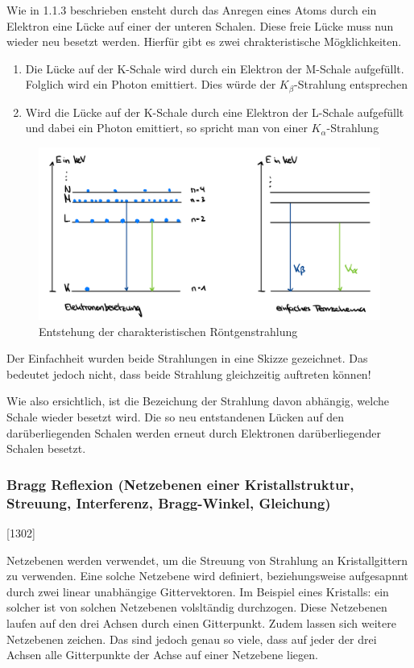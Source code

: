 \documentclass{article}
\begin{document}
Wie in 1.1.3 beschrieben ensteht durch das Anregen eines Atoms durch ein Elektron eine Lücke auf einer der unteren Schalen. Diese freie Lücke muss nun wieder neu besetzt werden. Hierfür gibt es zwei chrakteristische Mögklichkeiten.

\begin{enumerate}
    \item Die Lücke auf der K-Schale wird durch ein Elektron der M-Schale aufgefüllt. Folglich wird ein Photon emittiert. Dies würde der $K_{\beta}$-Strahlung entsprechen
    \item Wird die Lücke auf der K-Schale durch eine Elektron der L-Schale aufgefüllt und dabei ein Photon emittiert, so spricht man von einer $K_{\alpha}$-Strahlung
\end{enumerate}

\begin{figure}[H]
    \centering
    \includegraphics[width=0.6\linewidth]{Abbildungen/Entstehung_R.Strahlung.jpeg}
    \caption{Entstehung der charakteristischen Röntgenstrahlung}
\end{figure}

Der Einfachheit wurden beide Strahlungen in eine Skizze gezeichnet. Das bedeutet jedoch nicht, dass beide Strahlung gleichzeitig auftreten können!

Wie also ersichtlich, ist die Bezeichung der Strahlung davon abhängig, welche Schale wieder besetzt wird. 
Die so neu entstandenen Lücken auf den darüberliegenden Schalen werden erneut durch Elektronen darüberliegender Schalen besetzt. 


\subsubsection{Bragg Reflexion (Netzebenen einer Kristallstruktur, Streuung, Interferenz, Bragg-Winkel, Gleichung)}

\cite{Physik} [1302]

Netzebenen werden verwendet, um die Streuung von Strahlung an Kristallgittern zu verwenden. Eine solche Netzebene wird definiert, beziehungsweise aufgesapnnt durch zwei linear unabhängige Gittervektoren. Im Beispiel eines Kristalls: ein solcher ist von solchen Netzebenen volsltändig durchzogen. Diese Netzebenen laufen auf den drei Achsen durch einen Gitterpunkt. Zudem lassen sich weitere Netzebenen zeichen. Das sind jedoch genau so viele, dass auf jeder der drei Achsen alle Gitterpunkte der Achse auf einer Netzebene liegen. 
\end{document}
